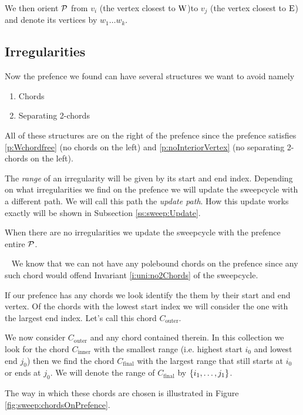     We then orient $\P$ from $v_i$ (the vertex closest to $\pW$)to $v_j$ (the vertex closest to $\pE$) and denote its vertices by $w_1 \ldots w_k$.

  \subsection{Irregularities}
    Now the prefence we found can have several structures we want to avoid
    namely
    \begin{enumerate}
      \itemsep=-4pt
      \item Chords
      \item Separating 2-chords
    \end{enumerate}

    All of these structures are on the right of the prefence since the prefence satisfies \ref{p:Wchordfree} (no chords on the left) and \ref{p:noInteriorVertex} (no separating 2-chords on the left).

    The \emph{range} of an irregularity will be given by its start and end index. Depending on what irregularities we find on the prefence we will update the sweepcycle with a different path. We will call this path the \emph{update path}. How this update works exactly will be shown in Subsection \ref{ss:sweep:Update}.

      When there are no irregularities we update the sweepcycle with the prefence entire $\P$.

     \mbox{ }
    We know that we can not have any polebound chords on the prefence since any such chord would offend Invariant \ref{i:uni:no2Chords} of the sweepcycle.

    If our prefence has any chords we look identify the them by their start and end vertex. Of the chords with the lowest start index we will consider the one with the largest end index. Let's call this chord $C_\text{outer}$.

    We now consider $C_\text{outer}$ and any chord contained therein. In this collection we look for the chord $C_\text{inner}$ with the smallest range (i.e. highest start $i_0$ and lowest end $j_0$) then we find the chord $C_\text{final}$ with the largest range that still starts at $i_0$ or ends at $j_0$. We will denote the range of $C_\text{final}$ by $\braces{i_1, \ldots, j_1}$.

    The way in which these chords are chosen is illustrated in Figure \ref{fig:sweep:chordsOnPrefence}.


